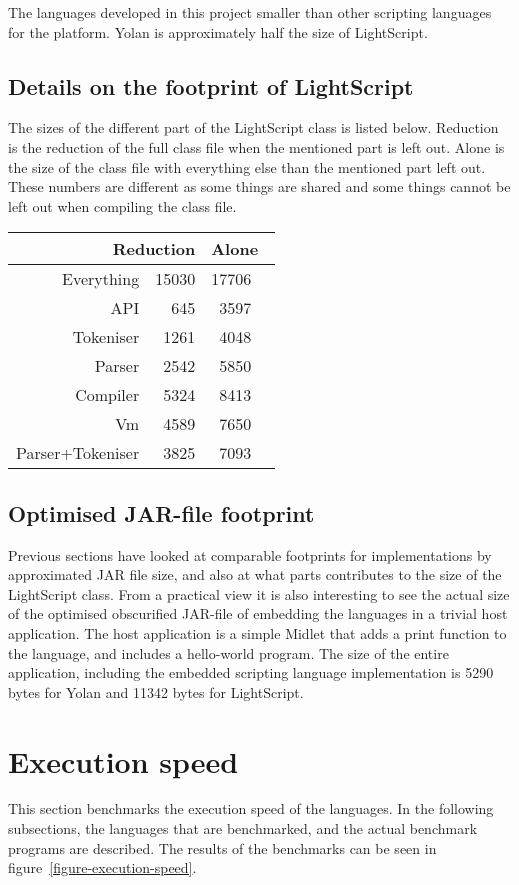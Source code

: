 \documentclass[11pt]{report}
\begin{document}
The languages developed in this project smaller than other scripting languages for the platform. 
Yolan is approximately half the size of LightScript. 

\subsection{Details on the footprint of LightScript}
The sizes of the different part of the LightScript class is listed below.
Reduction is the reduction of the full class file when the mentioned part is left out. Alone is the size of the class file with everything else than the mentioned part left out. These numbers are different as some things are shared and some things cannot be left out when compiling the class file.

\begin{center} \begin{tabular}{|r|r|rl|} \hline
\multicolumn{2}{|r|}{Reduction} & \multicolumn{2}{|l|}{Alone}\\ \hline
Everything & 15030 & 17706 & \\ \hline
API & 645  & 3597  & \\ \hline
Tokeniser & 1261 & 4048 & \\ \hline
Parser & 2542 & 5850 & \\ \hline
Compiler & 5324 & 8413 & \\ \hline
Vm & 4589 & 7650 & \\ \hline
Parser+Tokeniser & 3825 & 7093 & \\ \hline
\end{tabular} \end{center}

\subsection{Optimised JAR-file footprint}
Previous sections have looked at comparable footprints for implementations by approximated JAR file size, and also at what parts contributes to the size of the LightScript class.
From a practical view it is also interesting to see the actual size of the optimised obscurified JAR-file of embedding the languages in a trivial host application.
The host application is a simple Midlet that adds a print function to the language, and includes a hello-world program.
The size of the entire application, including the embedded scripting language implementation is 5290 bytes for Yolan and 11342 bytes for LightScript. 

\section{Execution speed}
This section benchmarks the execution speed of the languages. 
In the following subsections, the languages that are benchmarked, and the actual benchmark programs are described.
The results of the benchmarks can be seen in figure~\ref{figure-execution-speed}.
\end{document}
